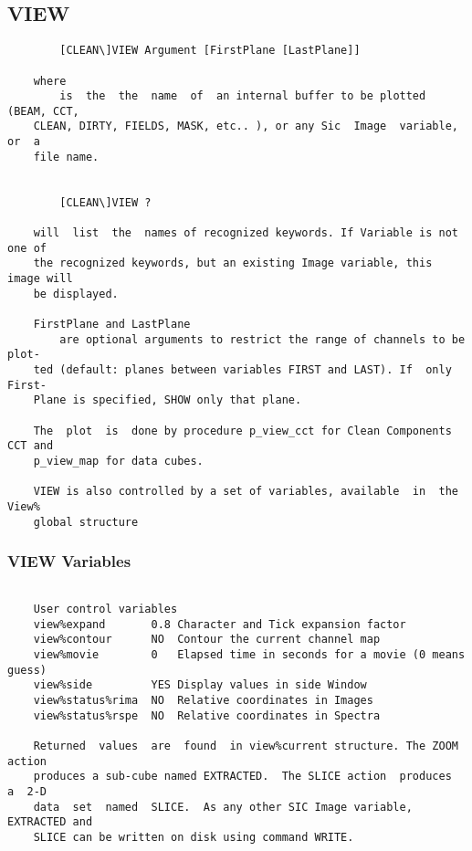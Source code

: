 \subsection{VIEW}
\begin{verbatim}
        [CLEAN\]VIEW Argument [FirstPlane [LastPlane]]

    where
        is  the  the  name  of  an internal buffer to be plotted (BEAM, CCT,
    CLEAN, DIRTY, FIELDS, MASK, etc.. ), or any Sic  Image  variable,  or  a
    file name.


        [CLEAN\]VIEW ?

    will  list  the  names of recognized keywords. If Variable is not one of
    the recognized keywords, but an existing Image variable, this image will
    be displayed.

    FirstPlane and LastPlane
        are optional arguments to restrict the range of channels to be plot-
    ted (default: planes between variables FIRST and LAST). If  only  First-
    Plane is specified, SHOW only that plane.

    The  plot  is  done by procedure p_view_cct for Clean Components CCT and
    p_view_map for data cubes.

    VIEW is also controlled by a set of variables, available  in  the  View%
    global structure

\end{verbatim}
\subsubsection{VIEW Variables}
\begin{verbatim}

    User control variables
    view%expand       0.8 Character and Tick expansion factor
    view%contour      NO  Contour the current channel map
    view%movie        0   Elapsed time in seconds for a movie (0 means guess)
    view%side         YES Display values in side Window
    view%status%rima  NO  Relative coordinates in Images
    view%status%rspe  NO  Relative coordinates in Spectra

    Returned  values  are  found  in view%current structure. The ZOOM action
    produces a sub-cube named EXTRACTED.  The SLICE action  produces  a  2-D
    data  set  named  SLICE.  As any other SIC Image variable, EXTRACTED and
    SLICE can be written on disk using command WRITE.

\end{verbatim}
